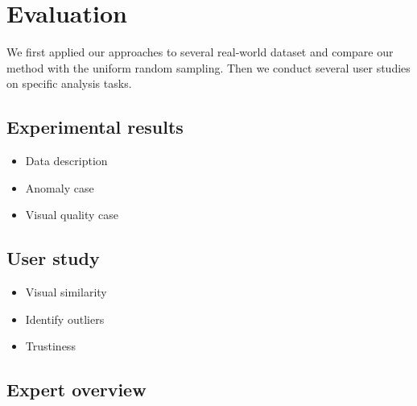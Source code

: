 \section{Evaluation}
We first applied our approaches to several real-world dataset and compare our method with the uniform random sampling. Then we conduct several user studies on specific analysis tasks. 
\subsection{Experimental results}

\begin{itemize}[noitemsep]
    \item Data description
    \item Anomaly case
    \item Visual quality case
\end{itemize}

\subsection{User study}
\begin{itemize}[noitemsep]
    \item Visual similarity
    \item Identify outliers
    \item Trustiness 
\end{itemize}

\subsection{Expert overview}

